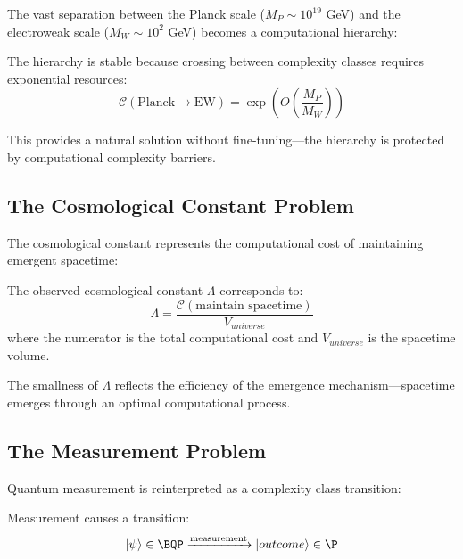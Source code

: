 \documentclass[12pt,a4paper]{article}
\newcommand{\comp}[1]{\mathcal{C}(#1)}
\begin{document}
The vast separation between the Planck scale ($M_P \sim 10^{19}$ GeV) and the electroweak scale ($M_W \sim 10^2$ GeV) becomes a computational hierarchy:

\begin{theorem}
The hierarchy is stable because crossing between complexity classes requires exponential resources:
\begin{equation}
\comp{\text{Planck} \to \text{EW}} = \exp\left(O\left(\frac{M_P}{M_W}\right)\right)
\end{equation}
\end{theorem}

This provides a natural solution without fine-tuning—the hierarchy is protected by computational complexity barriers.

\subsection{The Cosmological Constant Problem}

The cosmological constant represents the computational cost of maintaining emergent spacetime:

\begin{proposition}
The observed cosmological constant $\Lambda$ corresponds to:
\begin{equation}
\Lambda = \frac{\comp{\text{maintain spacetime}}}{V_{universe}}
\end{equation}
where the numerator is the total computational cost and $V_{universe}$ is the spacetime volume.
\end{proposition}

The smallness of $\Lambda$ reflects the efficiency of the emergence mechanism—spacetime emerges through an optimal computational process.

\subsection{The Measurement Problem}

Quantum measurement is reinterpreted as a complexity class transition:

\begin{definition}
Measurement causes a transition:
\begin{equation}
\ket{\psi} \in \BQP \xrightarrow{\text{measurement}} |outcome\rangle \in \P
\end{equation}
\end{definition}
\end{document}
